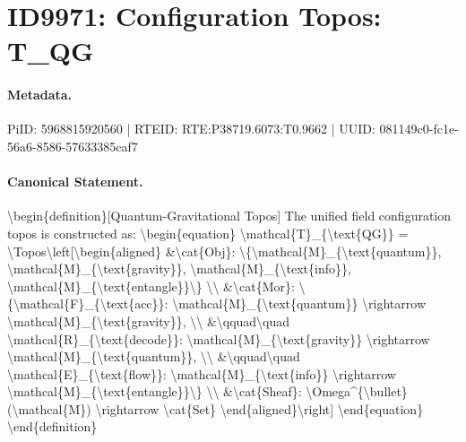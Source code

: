 \section*{ID9971: Configuration Topos: T\_QG}
\paragraph{Metadata.}
PiID: 5968815920560 | RTEID: RTE:P38719.6073:T0.9662 | UUID: 081149c0-fc1e-56a6-8586-57633385caf7

\paragraph{Canonical Statement.}
\textbackslash{}begin\{definition\}[Quantum-Gravitational Topos] The unified field configuration topos is constructed as: \textbackslash{}begin\{equation\} \textbackslash{}mathcal\{T\}\_\{\textbackslash{}text\{QG\}\} = \textbackslash{}Topos\textbackslash{}left[\textbackslash{}begin\{aligned\} \&\textbackslash{}cat\{Obj\}: \textbackslash{}\{\textbackslash{}mathcal\{M\}\_\{\textbackslash{}text\{quantum\}\}, \textbackslash{}mathcal\{M\}\_\{\textbackslash{}text\{gravity\}\}, \textbackslash{}mathcal\{M\}\_\{\textbackslash{}text\{info\}\}, \textbackslash{}mathcal\{M\}\_\{\textbackslash{}text\{entangle\}\}\textbackslash{}\} \textbackslash{}\textbackslash{} \&\textbackslash{}cat\{Mor\}: \textbackslash{}\{\textbackslash{}mathcal\{F\}\_\{\textbackslash{}text\{acc\}\}: \textbackslash{}mathcal\{M\}\_\{\textbackslash{}text\{quantum\}\} \textbackslash{}rightarrow \textbackslash{}mathcal\{M\}\_\{\textbackslash{}text\{gravity\}\}, \textbackslash{}\textbackslash{} \&\textbackslash{}qquad\textbackslash{}quad \textbackslash{}mathcal\{R\}\_\{\textbackslash{}text\{decode\}\}: \textbackslash{}mathcal\{M\}\_\{\textbackslash{}text\{gravity\}\} \textbackslash{}rightarrow \textbackslash{}mathcal\{M\}\_\{\textbackslash{}text\{quantum\}\}, \textbackslash{}\textbackslash{} \&\textbackslash{}qquad\textbackslash{}quad \textbackslash{}mathcal\{E\}\_\{\textbackslash{}text\{flow\}\}: \textbackslash{}mathcal\{M\}\_\{\textbackslash{}text\{info\}\} \textbackslash{}rightarrow \textbackslash{}mathcal\{M\}\_\{\textbackslash{}text\{entangle\}\}\textbackslash{}\} \textbackslash{}\textbackslash{} \&\textbackslash{}cat\{Sheaf\}: \textbackslash{}Omega\textasciicircum{}\{\textbackslash{}bullet\}(\textbackslash{}mathcal\{M\}) \textbackslash{}rightarrow \textbackslash{}cat\{Set\} \textbackslash{}end\{aligned\}\textbackslash{}right] \textbackslash{}end\{equation\} \textbackslash{}end\{definition\}

